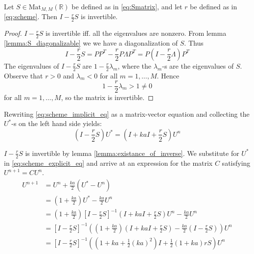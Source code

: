 \begin{lemma}
  \label{lemma:existance_of_inverse}
Let \( S \in \text{Mat}_{M,M}(\mathbb{R}) \) be defined as in \eqref{eq:Smatrix},
and let \( r \) be defined as in \eqref{eq:scheme}.
  Then \( I - \frac{r}{2} S\) is invertible.
\end{lemma}
\begin{proof}
  \( I - \frac{r}{2} S \) is invertible iff. all the eigenvalues are nonzero.
  From lemma \ref{lemma:S_diagonalizable} we we have a diagonalization of \( S \). Thus
  \begin{equation*}
      I - \frac{r}{2} S
      = PP^T - \frac{r}{2} P\Lambda P^T
      = P \left(I - \frac{r}{2} \Lambda \right) P^T
  \end{equation*}
  The eigenvalues of \( I - \frac{r}{2}S \) are
  \( 1 - \frac{r}{2} \lambda_m\),
  where the \( \lambda_m \)-s are the eigenvalues of \( S \).
  Observe that \( r > 0 \) and \( \lambda_m < 0 \) for all \( m = 1, \dots, M \).
  Hence
  \[
    1 - \frac{r}{2} \lambda_m > 1 \neq 0
  \]
  for all \( m = 1, \dots, M \), so the matrix is invertible.
\end{proof}

Rewriting \eqref{eq:scheme_implicit_eq} as a matrix-vector equation
and collecting the \( U^* \)-s on the left hand side yields:
\begin{equation}
  \left(I - \frac{r}{2}S\right)U^* = \left(I + kaI + \frac{r}{2}S\right) U^n
\end{equation}

\( I - \frac{r}{2}S \) is invertible
by lemma \ref{lemma:existance_of_inverse}.
We substitute for \( U^* \)
in \eqref{eq:scheme_explicit_eq}
and arrive at an expression for the matrix \( C \)
satisfying \( U^{n+1} = C U^n \).
\begin{align*}
  U^{n+1} &= U^n + \frac{ka}{2}\left(U^*  - U^n\right) \\
          &= \left(1 + \frac{ka}{2}\right) U^* - \frac{ka}{2}U^n \\
          &= \left(1 + \frac{ka}{2}\right) {\left[I - \frac{r}{2}S\right]}^{-1} \left(I + kaI + \frac{r}{2}S\right) U^n - \frac{ka}{2}U^n \\
          &= {\left[I - \frac{r}{2}S\right]}^{-1} \left(\left(1 + \frac{ka}{2}\right)\left(I + kaI + \frac{r}{2}S\right) - \frac{ka}{2}\left(I-\frac{r}{2}S\right)\right) U^n \\
          &= {\left[I - \frac{r}{2}S\right]}^{-1} \left( \left(1+ka+\frac{1}{2}(ka)^2\right)I + \frac{1}{2}\left(1+ka\right)rS\right) U^n
\end{align*}

